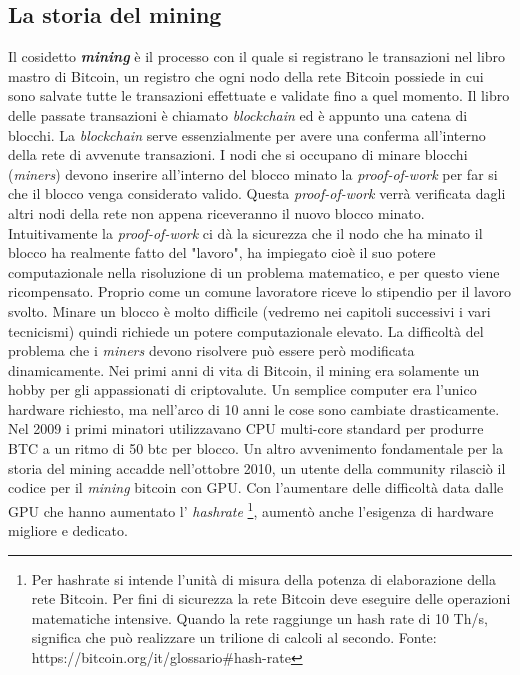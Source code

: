 \subsection{La storia del mining}
\label{sec:impostazione}
Il cosidetto \textit{\textbf{mining}} \`e il processo con il quale si registrano le transazioni nel libro mastro di Bitcoin, un registro che ogni nodo della rete Bitcoin possiede in cui sono salvate tutte le transazioni effettuate e validate fino a quel momento. Il libro delle passate transazioni \`e chiamato \textit{blockchain} ed \`e appunto una catena di blocchi. La \textit{blockchain} serve essenzialmente per avere una conferma all'interno della rete di avvenute transazioni. I nodi che si occupano di minare blocchi (\textit{miners}) devono inserire all'interno del blocco minato la \textit{proof-of-work} per far si che il blocco venga considerato valido. Questa \textit{proof-of-work} verr\`a verificata dagli altri nodi della rete non appena riceveranno il nuovo blocco minato. Intuitivamente la \textit{proof-of-work} ci d\`a la sicurezza che il nodo che ha minato il blocco ha realmente fatto del "lavoro", ha impiegato cio\`e il suo potere computazionale nella risoluzione di un problema matematico, e per questo viene ricompensato. Proprio come un comune lavoratore riceve lo stipendio per il lavoro svolto.
Minare un blocco \`e molto difficile (vedremo nei capitoli successivi i vari tecnicismi) quindi richiede un potere computazionale elevato.
La difficolt\`a del problema che i \textit{miners} devono risolvere pu\`o essere per\`o modificata dinamicamente. Nei primi anni di vita di Bitcoin, il mining era solamente un hobby per gli appassionati di criptovalute. Un semplice computer era l'unico hardware richiesto, ma nell'arco di 10 anni le cose sono cambiate drasticamente.\\
Nel 2009 i primi minatori utilizzavano CPU multi-core standard per produrre BTC a un ritmo di 50 btc per blocco. Un altro avvenimento fondamentale per la storia del mining accadde nell'ottobre 2010, un utente della community rilasci\`o il codice per il \textit{mining} bitcoin con GPU. Con l'aumentare delle difficolt\`a data dalle GPU che hanno aumentato l' \textit{hashrate} \footnote{Per hashrate si intende l'unit\`a di misura della potenza di elaborazione della rete Bitcoin. Per fini di sicurezza la rete Bitcoin deve eseguire delle operazioni matematiche intensive. Quando la rete raggiunge un hash rate di 10 Th/s, significa che pu\`o realizzare un trilione di calcoli al secondo. Fonte: https://bitcoin.org/it/glossario\#hash-rate}, aument\`o anche l'esigenza di hardware migliore e dedicato.\\
